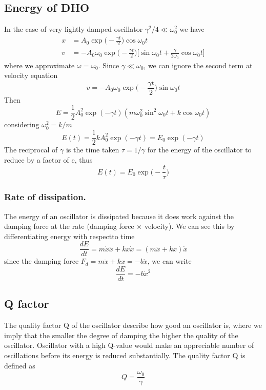\documentclass[../../main.tex]{subfiles}
\begin{document}
\subsection{Energy of DHO}
In the case of very lightly damped oscillator $\gamma^2/4\ll \omega_0^2$ we have
\begin{align*}
    x &= A_0\exp\biggl(-\frac{\gamma t}{2}\biggr)\cos\omega_0 t\\
    v&=-A_0\omega_0\exp\biggl(-\frac{\gamma t}{2}\biggr)\biggl[\sin\omega_0t +\frac{\gamma}{2\omega_0}\cos\omega_0 t\biggr]
\end{align*}
where we approximate $\omega=\omega_0$. Since $\gamma \ll \omega_0$, we can ignore the second term at velocity equation
\begin{equation*}
    v=-A_0\omega_0\exp\biggl(-\frac{\gamma t}{2}\biggr)\sin\omega_0t 
\end{equation*}
Then
\begin{equation*}
    E=\frac{1}{2}A_0^2 \exp(-\gamma t)(m\omega_0^2\sin^2\omega_0t+k\cos\omega_0t)
\end{equation*}
considering $\omega_0^2=k/m$
\begin{equation*}
   E(t)= \frac{1}{2}kA_0^2\exp(-\gamma t) =E_0\exp(-\gamma t) 
\end{equation*}
The reciprocal of $\gamma$ is the time taken $\tau=1/\gamma$ for the energy of the oscillator to reduce by a factor of e, thus
\begin{equation*}
    E(t)=E_0\exp \biggl(-\frac{t}{\tau}\biggr)
\end{equation*}

\subsubsection{Rate of dissipation.} The energy of an oscillator is dissipated because it does work against the damping force at the rate (damping force $\times$ velocity). We can see this by differentiating energy with respectto time
\begin{equation*}
    \frac{dE}{dt}=m\dot{x}\ddot{x}+kx\dot{x}=(m\ddot{x}+kx)\dot{x}
\end{equation*}
since the damping force $F_d=m\ddot{x}+kx=-b\dot{x}$, we can write
\begin{equation*}
    \frac{dE}{dt}=-b\dot{x}^2
\end{equation*}

\subsection{Q factor}
The quality factor Q of the oscillator describe how good an oscillator is, where we imply that the smaller the degree of damping the higher the quality of the oscillator. Oscillator with a high Q-value would make an appreciable number of oscillations before its energy is reduced substantially. The quality factor Q is defined as
\begin{equation*}
    Q=\frac{\omega_0}{\gamma}
\end{equation*}
\end{document}
